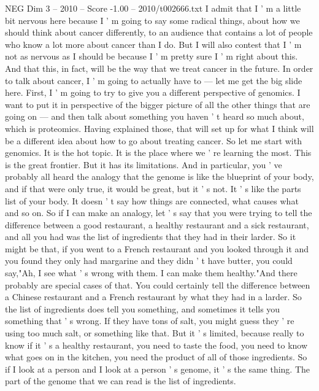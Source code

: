 \begin{textsample}{NEG Dim 3 – 2010 – Score -1.00 – 2010/t002666.txt}  \label{ex:f3_neg_027}
I admit that I ' m a little bit nervous here because I ' m going to say some radical things, about how we should think about cancer differently, to an audience that contains a lot of people who know a lot more about cancer than I do.
But I will also contest that I ' m not as nervous as I should be because I ' m pretty sure I ' m right about this.
And that this, in fact, will be the way that we treat cancer in the future.
In order to talk about cancer, I ' m going to actually have to — let me get the big slide here.
First, I ' m going to try to give you a different perspective of genomics.
I want to put it in perspective of the bigger picture of all the other things that are going on — and then talk about something you haven ' t heard so much about, which is proteomics.
Having explained those, that will set up for what I think will be a different idea about how to go about treating cancer.
So let me start with genomics.
It is the hot topic.
It is the place where we ' re learning the most.
This is the great frontier.
But it has its limitations.
And in particular, you ' ve probably all heard the analogy that the genome is like the blueprint of your body, and if that were only true, it would be great, but it ' s not.
It ' s like the parts list of your body.
It doesn ' t say how things are connected, what causes what and so on.
So if I can make an analogy, let ' s say that you were trying to tell the difference between a good restaurant, a healthy restaurant and a sick restaurant, and all you had was the list of ingredients that they had in their larder.
So it might be that, if you went to a French restaurant and you looked through it and you found they only had margarine and they didn ' t have butter, you could say,"Ah, I see what ' s wrong with them.
I can make them healthy."And there probably are special cases of that.
You could certainly tell the difference between a Chinese restaurant and a French restaurant by what they had in a larder.
So the list of ingredients does tell you something, and sometimes it tells you something that ' s wrong.
If they have tons of salt, you might guess they ' re using too much salt, or something like that.
But it ' s limited, because really to know if it ' s a healthy restaurant, you need to taste the food, you need to know what goes on in the kitchen, you need the product of all of those ingredients.
So if I look at a person and I look at a person ' s genome, it ' s the same thing.
The part of the genome that we can read is the list of ingredients.

\end{textsample}
